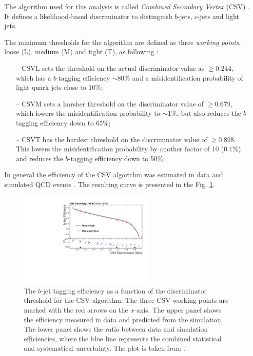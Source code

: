 The algorithm used for this analysis is called \textit{Combined Secondary Vertex} (CSV) \cite{CMS-PAS-BTV-13-001}. It defines a likelihood-based discriminator 
to distinguish $b$-jets, $c$-jets and light jets.

The minimum thresholds for the algorithm are defined as three \textit{working points}, loose (L), medium (M) and tight (T), as following \cite{CMS-PAS-BTV-13-001}:

\begin{itemize}
 \item [--] CSVL sets the threshold on the actual discriminator value as $\geq 0.244$, which has a $b$-tagging efficiency $\sim 80\%$ and a misidentification probability of
 light quark jets close to $10\%$;
 \item [--] CSVM sets a harsher threshold on the discriminator value of $\geq 0.679$, which lowers the misidentification probability to $\sim 1\%$, but also
 reduces the $b$-tagging efficiency down to 65$\%$;
 \item [--] CSVT has the hardest threshold on the discriminator value of $\geq 0.898$. This lowers the misidentification probability by another factor of 10 ($0.1\%$)
 and reduces the $b$-tagging efficiency down to 50$\%$;
\end{itemize}

In general the efficiency of the CSV algorithm was estimated in data and simulated QCD events \cite{CMS-PAS-BTV-13-001}. The resulting curve is presented in the Fig. \ref{fig:CSVeff}.

\begin{figure}[t]
  \centering
  \includegraphics[width=0.6\textwidth]{04_event_reconstruction/plots/Figure_012-b.pdf}
  \caption{The $b$-jet tagging efficiency as a function of the discriminator threshold for the CSV algorithm. The three CSV working points are marked with the red arrows on the $x$-axis.
  The upper panel shows the efficiency measured in data and predicted from the simulation.
  The lower panel shows the ratio between data and simulation efficiencies, where the blue line represents the combined statistical and systematical uncertainty. The plot is taken from \cite{CMS-PAS-BTV-13-001}.}
  \label{fig:CSVeff}
\end{figure}

